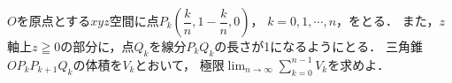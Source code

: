 \documentclass[../../main.tex]{subfiles}
\begin{document}
$O$を原点とする$xyz$空間に点$\displaystyle P_k \left( \dfrac{k}{n},1-\dfrac{k}{n},0 \right)$，
$k=0,1,\cdots,n$，をとる．
また，$z$軸上$z \geqq 0$の部分に，点$Q_k$を線分$P_kQ_k$の長さが1になるようにとる．
三角錐$OP_kP_{k+1}Q_k$の体積を$V_k$とおいて，
極限$\displaystyle\lim_{n\to\infty}\sum_{k=0}^{n-1}V_k$を求めよ．
\end{document}
